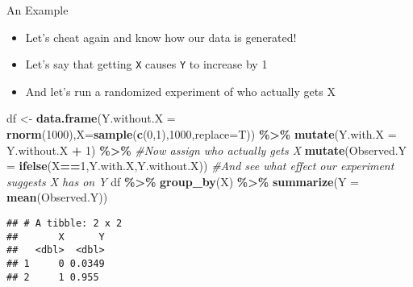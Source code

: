 \documentclass[
  ignorenonframetext,
]{beamer}
\newenvironment{Shaded}{\begin{snugshade}}{\end{snugshade}}
\newcommand{\AttributeTok}[1]{\textcolor[rgb]{0.13,0.29,0.53}{#1}}
\newcommand{\CommentTok}[1]{\textcolor[rgb]{0.56,0.35,0.01}{\textit{#1}}}
\newcommand{\DecValTok}[1]{\textcolor[rgb]{0.00,0.00,0.81}{#1}}
\newcommand{\FunctionTok}[1]{\textcolor[rgb]{0.13,0.29,0.53}{\textbf{#1}}}
\newcommand{\NormalTok}[1]{#1}
\newcommand{\OtherTok}[1]{\textcolor[rgb]{0.56,0.35,0.01}{#1}}
\newcommand{\SpecialCharTok}[1]{\textcolor[rgb]{0.81,0.36,0.00}{\textbf{#1}}}
\providecommand{\tightlist}{%
  \setlength{\itemsep}{0pt}\setlength{\parskip}{0pt}}
\begin{document}
\begin{frame}[fragile]{An Example}
\label{an-example}
\begin{itemize}
\tightlist
\item
  Let's cheat again and know how our data is generated!
\item
  Let's say that getting \texttt{X} causes \texttt{Y} to increase by 1
\item
  And let's run a randomized experiment of who actually gets X
\end{itemize}

\begin{Shaded}
\begin{Highlighting}[]
\NormalTok{df }\OtherTok{\textless{}{-}} \FunctionTok{data.frame}\NormalTok{(}\AttributeTok{Y.without.X =} \FunctionTok{rnorm}\NormalTok{(}\DecValTok{1000}\NormalTok{),}\AttributeTok{X=}\FunctionTok{sample}\NormalTok{(}\FunctionTok{c}\NormalTok{(}\DecValTok{0}\NormalTok{,}\DecValTok{1}\NormalTok{),}\DecValTok{1000}\NormalTok{,}\AttributeTok{replace=}\NormalTok{T)) }\SpecialCharTok{\%\textgreater{}\%}
\FunctionTok{mutate}\NormalTok{(}\AttributeTok{Y.with.X =}\NormalTok{ Y.without.X }\SpecialCharTok{+} \DecValTok{1}\NormalTok{) }\SpecialCharTok{\%\textgreater{}\%}
\CommentTok{\#Now assign who actually gets X}
\FunctionTok{mutate}\NormalTok{(}\AttributeTok{Observed.Y =} \FunctionTok{ifelse}\NormalTok{(X}\SpecialCharTok{==}\DecValTok{1}\NormalTok{,Y.with.X,Y.without.X))}
\CommentTok{\#And see what effect our experiment suggests X has on Y}
\NormalTok{df }\SpecialCharTok{\%\textgreater{}\%} \FunctionTok{group\_by}\NormalTok{(X) }\SpecialCharTok{\%\textgreater{}\%} \FunctionTok{summarize}\NormalTok{(}\AttributeTok{Y =} \FunctionTok{mean}\NormalTok{(Observed.Y))}
\end{Highlighting}
\end{Shaded}

\begin{verbatim}
## # A tibble: 2 x 2
##       X      Y
##   <dbl>  <dbl>
## 1     0 0.0349
## 2     1 0.955
\end{verbatim}
\end{frame}
\end{document}
